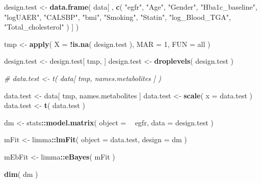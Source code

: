 \documentclass[]{article}
\newenvironment{Shaded}{\begin{snugshade}}{\end{snugshade}}
\newcommand{\CommentTok}[1]{\textcolor[rgb]{0.56,0.35,0.01}{\textit{#1}}}
\newcommand{\DataTypeTok}[1]{\textcolor[rgb]{0.13,0.29,0.53}{#1}}
\newcommand{\DecValTok}[1]{\textcolor[rgb]{0.00,0.00,0.81}{#1}}
\newcommand{\KeywordTok}[1]{\textcolor[rgb]{0.13,0.29,0.53}{\textbf{#1}}}
\newcommand{\NormalTok}[1]{#1}
\newcommand{\OperatorTok}[1]{\textcolor[rgb]{0.81,0.36,0.00}{\textbf{#1}}}
\newcommand{\StringTok}[1]{\textcolor[rgb]{0.31,0.60,0.02}{#1}}
\begin{document}
\begin{Shaded}
\begin{Highlighting}[]
\NormalTok{design.test <-}\StringTok{ }
\StringTok{  }\KeywordTok{data.frame}\NormalTok{( }
\NormalTok{    data[ , }
          \KeywordTok{c}\NormalTok{( }
            \StringTok{"egfr"}\NormalTok{,}
            \StringTok{"Age"}\NormalTok{,}
            \StringTok{"Gender"}\NormalTok{, }
            \StringTok{"Hba1c_baseline"}\NormalTok{,}
            \StringTok{"logUAER"}\NormalTok{,}
            \StringTok{"CALSBP"}\NormalTok{,}
            \StringTok{"bmi"}\NormalTok{,}
            \StringTok{"Smoking"}\NormalTok{,}
            \StringTok{"Statin"}\NormalTok{,}
            \StringTok{"log_Blood_TGA"}\NormalTok{,}
            \StringTok{"Total_cholesterol"}
\NormalTok{          )}
\NormalTok{          ]}
\NormalTok{  )}

\NormalTok{tmp <-}\StringTok{ }
\StringTok{  }\KeywordTok{apply}\NormalTok{( }
    \DataTypeTok{X =} \OperatorTok{!}\KeywordTok{is.na}\NormalTok{( design.test ), }
    \DataTypeTok{MAR =} \DecValTok{1}\NormalTok{, }
    \DataTypeTok{FUN =}\NormalTok{ all}
\NormalTok{  )}

\NormalTok{design.test <-}\StringTok{ }\NormalTok{design.test[ tmp, ]}
\NormalTok{design.test <-}\StringTok{ }\KeywordTok{droplevels}\NormalTok{( design.test )}

\CommentTok{# data.test <- t( data[ tmp, names.metabolites ] )}

\NormalTok{data.test <-}\StringTok{ }\NormalTok{data[ tmp, names.metabolites ]}
\NormalTok{data.test <-}\StringTok{ }\KeywordTok{scale}\NormalTok{( }\DataTypeTok{x =}\NormalTok{ data.test )}
\NormalTok{data.test <-}\StringTok{ }\KeywordTok{t}\NormalTok{( data.test )}

\NormalTok{dm <-}\StringTok{ }
\StringTok{  }\NormalTok{stats}\OperatorTok{::}\KeywordTok{model.matrix}\NormalTok{(}
    \DataTypeTok{object =} \OperatorTok{~}\StringTok{ }\NormalTok{egfr,}
    \DataTypeTok{data =}\NormalTok{ design.test}
\NormalTok{  )}

\NormalTok{mFit <-}\StringTok{ }
\StringTok{  }\NormalTok{limma}\OperatorTok{::}\KeywordTok{lmFit}\NormalTok{(}
    \DataTypeTok{object =}\NormalTok{ data.test,}
    \DataTypeTok{design =}\NormalTok{ dm}
\NormalTok{  )}

\NormalTok{mEbFit <-}\StringTok{ }\NormalTok{limma}\OperatorTok{::}\KeywordTok{eBayes}\NormalTok{( mFit )}

\KeywordTok{dim}\NormalTok{( dm )}
\end{Highlighting}
\end{Shaded}
\end{document}
